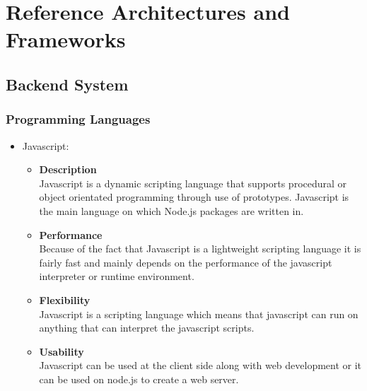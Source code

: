 \documentclass[11pt,fleqn]{book} %
\begin{document}
	
	
	
	\chapter{Reference Architectures and Frameworks}
	
	\section{Backend System}
	\subsection{Programming Languages}
	\begin{itemize}
		\item Javascript:
		\begin{itemize}
			\item \textbf{Description}\\
			Javascript is a dynamic scripting language that supports procedural or object orientated programming through use of prototypes. Javascript is the main language on which Node.js packages are written in.
			\item \textbf{Performance}\\
			Because of the fact that Javascript is a lightweight scripting language it is fairly fast and mainly depends on the performance of the javascript interpreter or runtime environment.
			\item \textbf{Flexibility}\\
			Javascript is a scripting language which means that javascript can run on anything that can interpret the javascript scripts.
			\item \textbf{Usability}\\
			Javascript can be used at the client side along with web development or it can be used on node.js to create a web server.
		\end{itemize}
	\end{itemize}
\end{document}
